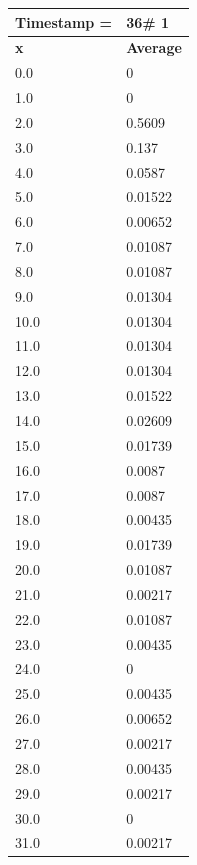 \begin{tabular}{|l||l|}
\hline
\textbf{Timestamp =} & \textbf{36}\# 1\\\hline
	\textbf{x} & \textbf{Average} \\ \hline
\hline
	0.0 & 0 \\ \hline
	1.0 & 0 \\ \hline
	2.0 & 0.5609 \\ \hline
	3.0 & 0.137 \\ \hline
	4.0 & 0.0587 \\ \hline
	5.0 & 0.01522 \\ \hline
	6.0 & 0.00652 \\ \hline
	7.0 & 0.01087 \\ \hline
	8.0 & 0.01087 \\ \hline
	9.0 & 0.01304 \\ \hline
	10.0 & 0.01304 \\ \hline
	11.0 & 0.01304 \\ \hline
	12.0 & 0.01304 \\ \hline
	13.0 & 0.01522 \\ \hline
	14.0 & 0.02609 \\ \hline
	15.0 & 0.01739 \\ \hline
	16.0 & 0.0087 \\ \hline
	17.0 & 0.0087 \\ \hline
	18.0 & 0.00435 \\ \hline
	19.0 & 0.01739 \\ \hline
	20.0 & 0.01087 \\ \hline
	21.0 & 0.00217 \\ \hline
	22.0 & 0.01087 \\ \hline
	23.0 & 0.00435 \\ \hline
	24.0 & 0 \\ \hline
	25.0 & 0.00435 \\ \hline
	26.0 & 0.00652 \\ \hline
	27.0 & 0.00217 \\ \hline
	28.0 & 0.00435 \\ \hline
	29.0 & 0.00217 \\ \hline
	30.0 & 0 \\ \hline
	31.0 & 0.00217 \\ \hline
\end{tabular}
